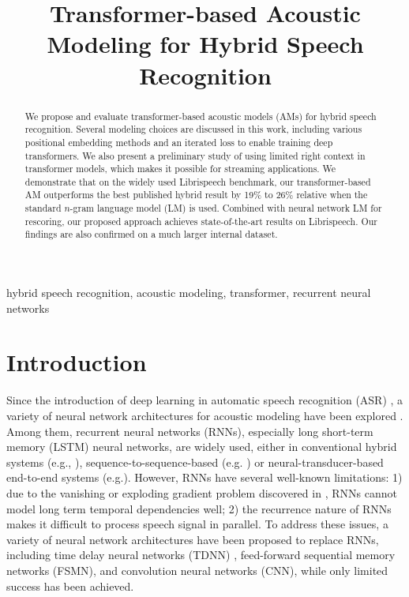 \documentclass{article}
\title{Transformer-based Acoustic Modeling for Hybrid  Speech Recognition}
\begin{document}
\ninept
\maketitle
\begin{abstract}\vspace{0.5em}
We propose and evaluate transformer-based acoustic models (AMs) for hybrid speech recognition. Several modeling choices are discussed in this work, including various positional embedding methods and an iterated loss to enable training deep transformers. We also present a preliminary study of using limited right context in transformer models, which makes it possible for streaming applications. We demonstrate that on the widely used Librispeech benchmark, our transformer-based AM outperforms the best published hybrid result by 19\% to 26\% relative when the standard $n$-gram language model (LM) is used. Combined with neural network LM for rescoring, our proposed approach achieves state-of-the-art results on Librispeech. Our findings are also confirmed on a much larger internal dataset.

\end{abstract}
\begin{keywords}
hybrid speech recognition, acoustic modeling, transformer, recurrent neural networks
\end{keywords}
\section{Introduction}
\label{sec:intro}

Since the introduction of deep learning in automatic speech recognition (ASR) \cite{hinton2012deep}, a variety of neural network architectures for acoustic modeling have been explored \cite{seide2011conversational, sak2014long, abdel2014convolutional, peddinti2015time, zhang2015feedforward}. Among them, recurrent neural networks (RNNs), especially long short-term memory (LSTM)\cite{hochreiter1997long} neural networks, are widely used, either in conventional hybrid systems (e.g., \cite{sak2014long, bahdanau2016end}), sequence-to-sequence-based (e.g. \cite{chiu2018state, park2019specaugment}) or neural-transducer-based end-to-end systems (e.g.\cite{he2019rnnt}). However, RNNs have several well-known limitations: 1) due to the vanishing or exploding gradient problem discovered in \cite{bengio1994learning}, RNNs cannot model long term temporal dependencies well; 2) the recurrence nature of RNNs makes it difficult to process speech signal in parallel. To address these issues, a variety of neural network architectures have been proposed to replace RNNs, including time delay neural networks (TDNN) \cite{peddinti2015time}, feed-forward sequential memory networks (FSMN)\cite{zhang2015feedforward}, and convolution neural networks (CNN)\cite{abdel2014convolutional, collobert2016wav2letter}, while only limited success has been achieved. 
\end{document}
